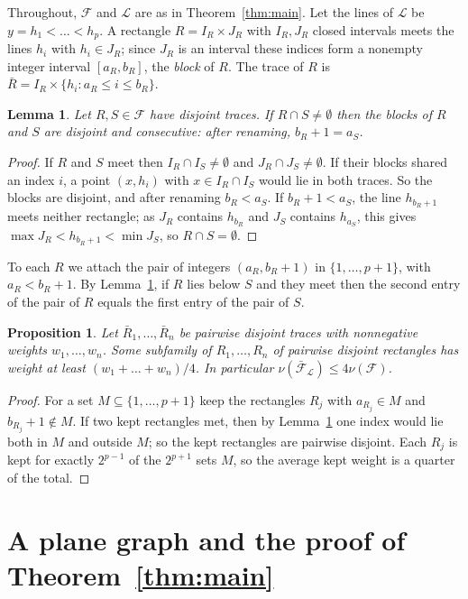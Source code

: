\documentclass[11pt]{article}
\newtheorem{proposition}[theorem]{Proposition}
\newtheorem{lemma}[theorem]{Lemma}
\theoremstyle{remark}
\newcommand{\F}{\mathcal{F}}
\newcommand{\Fb}{\bar{\mathcal{F}}}
\newcommand{\cL}{\mathcal{L}}
\begin{document}
Throughout, $\F$ and $\cL$ are as in Theorem~\ref{thm:main}. Let the lines of $\cL$ be $y=h_1<\dots<h_p$. A rectangle $R=I_R\times J_R$ with $I_R,J_R$ closed intervals meets the lines $h_i$ with $h_i\in J_R$; since $J_R$ is an interval these indices form a nonempty integer interval $[a_R,b_R]$, the \emph{block} of $R$. The trace of $R$ is $\bar R=I_R\times\{h_i: a_R\le i\le b_R\}$.

\begin{lemma}\label{lem:blocks}
Let $R,S\in\F$ have disjoint traces. If $R\cap S\ne\emptyset$ then the blocks of $R$ and $S$ are disjoint and consecutive: after renaming, $b_R+1=a_S$.
\end{lemma}

\begin{proof}
If $R$ and $S$ meet then $I_R\cap I_S\ne\emptyset$ and $J_R\cap J_S\ne\emptyset$. If their blocks shared an index $i$, a point $(x,h_i)$ with $x\in I_R\cap I_S$ would lie in both traces. So the blocks are disjoint, and after renaming $b_R<a_S$. If $b_R+1<a_S$, the line $h_{b_R+1}$ meets neither rectangle; as $J_R$ contains $h_{b_R}$ and $J_S$ contains $h_{a_S}$, this gives $\max J_R<h_{b_R+1}<\min J_S$, so $R\cap S=\emptyset$.
\end{proof}

To each $R$ we attach the pair of integers $(a_R,b_R+1)$ in $\{1,\dots,p+1\}$, with $a_R<b_R+1$. By Lemma~\ref{lem:blocks}, if $R$ lies below $S$ and they meet then the second entry of the pair of $R$ equals the first entry of the pair of $S$.

\begin{proposition}\label{prop:four}
Let $\bar R_1,\dots,\bar R_n$ be pairwise disjoint traces with nonnegative weights $w_1,\dots,w_n$. Some subfamily of $R_1,\dots,R_n$ of pairwise disjoint rectangles has weight at least $(w_1+\dots+w_n)/4$. In particular $\nu(\Fb_\cL)\le 4\nu(\F)$.
\end{proposition}

\begin{proof}
For a set $M\subseteq\{1,\dots,p+1\}$ keep the rectangles $R_j$ with $a_{R_j}\in M$ and $b_{R_j}+1\notin M$. If two kept rectangles met, then by Lemma~\ref{lem:blocks} one index would lie both in $M$ and outside $M$; so the kept rectangles are pairwise disjoint. Each $R_j$ is kept for exactly $2^{p-1}$ of the $2^{p+1}$ sets $M$, so the average kept weight is a quarter of the total.
\end{proof}

\section{A plane graph and the proof of Theorem~\ref{thm:main}}\label{sec:planar}
\end{document}
